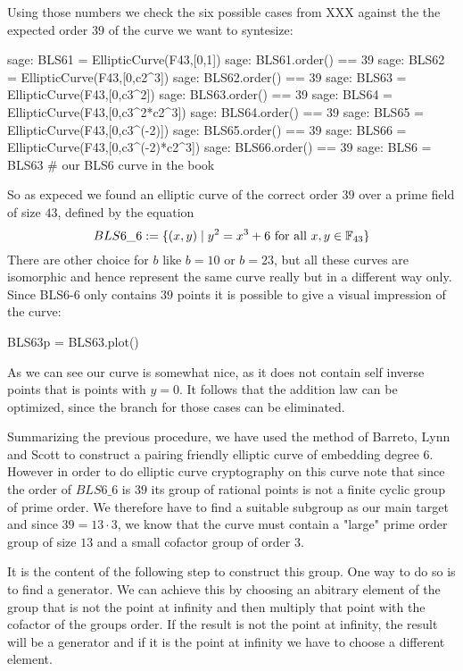 Using those numbers we check the six possible cases from XXX against the the expected order $39$ of the curve we want to syntesize:

\begin{sagecommandline}
sage: BLS61 = EllipticCurve(F43,[0,1])
sage: BLS61.order() == 39
sage: BLS62 = EllipticCurve(F43,[0,c2^3])
sage: BLS62.order() == 39
sage: BLS63 = EllipticCurve(F43,[0,c3^2])
sage: BLS63.order() == 39
sage: BLS64 = EllipticCurve(F43,[0,c3^2*c2^3])
sage: BLS64.order() == 39
sage: BLS65 = EllipticCurve(F43,[0,c3^(-2)])
sage: BLS65.order() == 39
sage: BLS66 = EllipticCurve(F43,[0,c3^(-2)*c2^3])
sage: BLS66.order() == 39
sage: BLS6 = BLS63 # our BLS6 curve in the book
\end{sagecommandline}
So as expeced we found an elliptic curve of the correct order $39$ over a prime field of size $43$, defined by the equation
\begin{equation}
BLS6\_6 := \{(x,y)\;|\; y^2 = x^3 + 6 \text{ for all } x,y \in \mathbb{F}_{43}\}
\end{equation}
There are other choice for $b$ like $b=10$ or $b=23$, but all these curves are isomorphic and hence represent the same curve really but in a different way only. Since BLS6-6 only contains $39$ points it is possible to give a visual impression of the curve:
\begin{sagesilent}
BLS63p = BLS63.plot()
\end{sagesilent}
\begin{center}
\end{center}
As we can see our curve is somewhat nice, as it does not contain self inverse points that is points with $y=0$. It follows that the addition law can be optimized, since the branch for those cases can be eliminated.

Summarizing the previous procedure, we have used the method of Barreto, Lynn and Scott to construct a pairing friendly elliptic curve of embedding degree $6$. However in order to do elliptic curve cryptography on this curve note that since the order of $BLS6\_6$ is $39$ its group of rational points is not a finite cyclic group of prime order. We therefore have to find a suitable subgroup as our main target and since $39=13\cdot 3$, we know that the curve must contain a "large" prime order group of size $13$ and a small cofactor group of order $3$.

It is the content of the following step to construct this group. One way to do so is to find a generator. We can achieve this by choosing an abitrary element of the group that is not the point at infinity and then multiply that point with the cofactor of the groups order. If the result is not the point at infinity, the result will be a generator and if it is the point at infinity we have to choose a different element.

